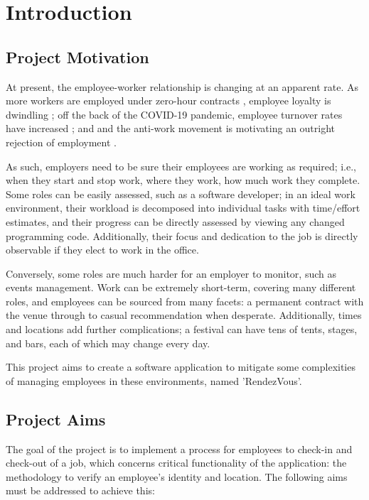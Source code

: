 \chapter{Introduction}

\section{Project Motivation}

At present, the employee-worker relationship is changing at
an apparent rate.
As more workers are employed under zero-hour contracts
\parencite{zeroHourContractsStats}, employee loyalty is
dwindling \parencite{zeroHourContractsLoyalty}; off the
back of the COVID-19 pandemic, employee turnover rates have
increased \parencite{employeeTurnover}; and and the
anti-work movement is motivating an outright rejection of
employment \parencite{antiWorkMovement}.

As such, employers need to be sure their employees are
working as required; i.e., when they start and stop work,
where they work, how much work they complete.
Some roles can be easily assessed, such as a software
developer; in an ideal work environment, their workload is
decomposed into individual tasks with time/effort
estimates, and their progress can be directly assessed by
viewing any changed programming code.
Additionally, their focus and dedication to the job is
directly observable if they elect to work in the office.

Conversely, some roles are much harder for an employer to
monitor, such as events management.
Work can be extremely short-term, covering many different
roles, and employees can be sourced from many facets: a
permanent contract with the venue through to casual
recommendation when desperate.
Additionally, times and locations add further
complications; a festival can have tens of tents, stages,
and bars, each of which may change every day.

This project aims to create a software application to
mitigate some complexities of managing employees in these
environments, named 'RendezVous'.

\section{Project Aims}

The goal of the project is to implement a process for
employees to \gls{check-in} and \gls{check-out} of a job,
which concerns critical functionality of the application:
the methodology to verify an employee's identity and
location.
The following aims must be addressed to achieve this:

